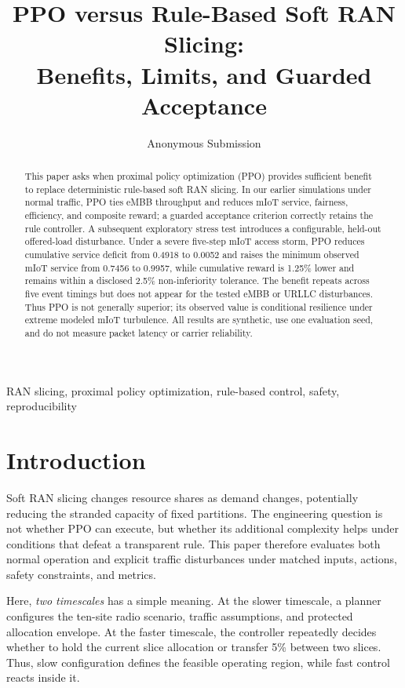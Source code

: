 \documentclass[conference]{IEEEtran}
\title{PPO versus Rule-Based Soft RAN Slicing:\\Benefits, Limits, and Guarded Acceptance}
\author{Anonymous Submission}
\begin{document}
\maketitle

\begin{abstract}
This paper asks when proximal policy optimization (PPO) provides sufficient benefit to replace deterministic rule-based soft RAN slicing. In our earlier simulations under normal traffic, PPO ties eMBB throughput and reduces mIoT service, fairness, efficiency, and composite reward; a guarded acceptance criterion correctly retains the rule controller. A subsequent exploratory stress test introduces a configurable, held-out offered-load disturbance. Under a severe five-step mIoT access storm, PPO reduces cumulative service deficit from 0.4918 to 0.0052 and raises the minimum observed mIoT service from 0.7456 to 0.9957, while cumulative reward is 1.25\% lower and remains within a disclosed 2.5\% non-inferiority tolerance. The benefit repeats across five event timings but does not appear for the tested eMBB or URLLC disturbances. Thus PPO is not generally superior; its observed value is conditional resilience under extreme modeled mIoT turbulence. All results are synthetic, use one evaluation seed, and do not measure packet latency or carrier reliability.
\end{abstract}

\begin{IEEEkeywords}
RAN slicing, proximal policy optimization, rule-based control, safety, reproducibility
\end{IEEEkeywords}

\section{Introduction}
Soft RAN slicing changes resource shares as demand changes, potentially reducing the stranded capacity of fixed partitions. The engineering question is not whether PPO can execute, but whether its additional complexity helps under conditions that defeat a transparent rule. This paper therefore evaluates both normal operation and explicit traffic disturbances under matched inputs, actions, safety constraints, and metrics.

Here, \emph{two timescales} has a simple meaning. At the slower timescale, a planner configures the ten-site radio scenario, traffic assumptions, and protected allocation envelope. At the faster timescale, the controller repeatedly decides whether to hold the current slice allocation or transfer 5\% between two slices. Thus, slow configuration defines the feasible operating region, while fast control reacts inside it.
\end{document}
